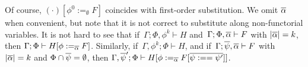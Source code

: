 \documentclass[runningheads]{llncs}
\begin{document}
\begin{comment} Substitution for second-order types is given below, using
  similar notations for vectors of types. Note that it is not correct
  to substitute along non-functorial variables.
\begin{definition}\label{def:second-order-subst}
 The operation $(\cdot)[\phi :=_{\ol \alpha} F]$ of {\em second-order
   type substitution along $\ol\alpha$} is defined by:
\[\begin{array}{lll}
\zerot[\phi :=_{\ol{\alpha}} F] & = & \zerot\\[0.5ex]
\onet[\phi :=_{\ol{\alpha}} F] & = & \onet\\[0.25ex]
(\Nat^{\ol\beta} G \,K)[\phi :=_{\ol{\alpha}} F]
& = & \Nat^{\ol\beta}\, (G[\phi :=_{\ol{\alpha}} F]) \,(K[\phi
  :=_{\ol{\alpha}} F])\\
(\psi\ol{G})[\phi :=_{\ol{\alpha}} F] & = &
\left\{\begin{array}{ll}
\psi \,\ol{G[\phi :=_{\ol{\alpha}} F]} & \mbox{if } \psi \not = \phi\\
  F[\ol{\alpha  := G[\phi :=_{\ol{\alpha}} F]}] 
  & \mbox{if } \psi = \phi
\end{array}\right.\\[2.8ex]
(G + K)[\phi :=_{\ol{\alpha}} F] & = & G[\phi
  :=_{\ol{\alpha}} F] + K[\phi :=_{\ol{\alpha}} F]\\[0.5ex] 
(G \times K)[\phi :=_{\ol{\alpha}} F] & = &
G[\phi :=_{\ol{\alpha}} F] \times K[\phi
  :=_{\ol{\alpha}} F]\\[0.5ex]   
((\mu \psi. \lambda \ol{\beta}.\, G)\ol{K})[\phi :=_{\ol{\alpha}}
  F] & = & (\mu \psi. \lambda \ol{\beta}. \,G[\phi :=_{\ol{\alpha}}
  F])\, \ol{K[\phi :=_{\ol{\alpha}} F]}
\end{array}\]
\end{definition}
\noindent
\end{comment}
Of course, $(\cdot)[\phi^0 :=_\emptyset F]$ coincides with
first-order substitution. We omit $\overline{\alpha}$ when convenient, but
note that it is not correct to substitute along non-functorial
variables. It is not hard to see that if \,$\Gamma; \Phi,\phi^k
\vdash H$ and\, $\Gamma;\Phi, \overline{\alpha} \vdash F$ with $|\overline{\alpha}|
= k$, then $\Gamma;\Phi \vdash H[\phi :=_{\overline{\alpha}} F]$.
Similarly, if \,$\Gamma, \phi^k; \Phi \vdash H$, and if\, $\Gamma;
\overline{\psi},\overline{\alpha} \vdash F$ with $|\overline{\alpha}| = k$ and $\Phi \cap
\overline{\psi} = \emptyset$, then $\Gamma,\overline{\psi}';\Phi \vdash H[\phi
  :=_{\overline{\alpha}} F[\overline{\psi :== \psi'}]]$.
\end{document}
